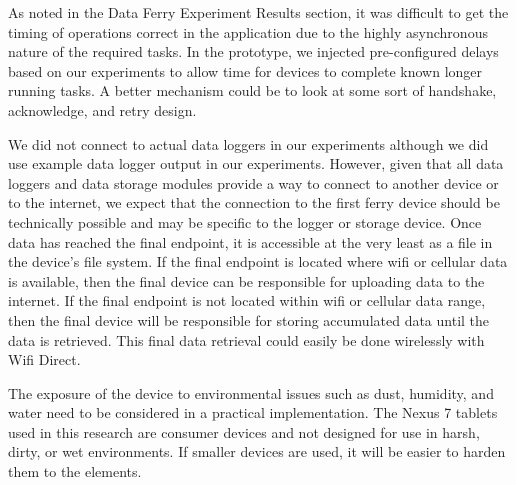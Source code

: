 \documentclass[10pt,twocolumn]{article}
\begin{document}


As noted in the Data Ferry Experiment Results section, it was difficult to get the timing of operations correct in the application due to the highly asynchronous nature of the required tasks.
In the prototype, we injected pre-configured delays based on our experiments to allow time for devices to complete known longer running tasks.
A better mechanism could be to look at some sort of handshake, acknowledge, and retry design.

We did not connect to actual data loggers in our experiments although we did use example data logger output in our experiments.
However, given that all data loggers and data storage modules provide a way to connect to another device or to the internet, 
we expect that the connection to the first ferry device should be technically possible and may be specific to the logger or storage device.
Once data has reached the final endpoint, it is accessible at the very least as a file in the device's file system.
If the final endpoint is located where wifi or cellular data is available, 
then the final device can be responsible for uploading data to the internet.
If the final endpoint is not located within wifi or cellular data range, 
then the final device will be responsible for storing accumulated data until the data is retrieved.
This final data retrieval could easily be done wirelessly with Wifi Direct.

The exposure of the device to environmental issues such as dust, humidity, and water need to be considered in a practical implementation.
The Nexus 7 tablets used in this research are consumer devices and not designed for use in harsh, dirty, or wet environments.
If smaller devices are used, it will be easier to harden them to the elements.
\end{document}
